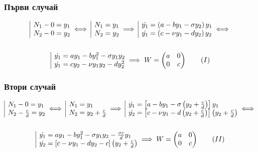 \documentclass[a4paper,fleqn,12pt]{article}
\begin{document}
\subsubsection{Първи случай}
\begin{gather*}
	\begin{array}{|l@{}}%
		 N_1 - 0 = y_1\\
		 N_2 - 0 = y_2
	\end{array} \iff 
	\begin{array}{|l@{}}%
		 N_1 = y_1\\
		 N_2 = y_2
	\end{array} \implies
	\begin{array}{|l@{}}
		\dot{y_1} = \left(a - by_1 - \sigma y_2 \right) y_1\\
		\dot{y_1} = \left(c - \nu y_1 - d y_2 \right) y_2 
	\end{array} \iff \\ \\
	\begin{array}{|l@{}}
		\dot{y_1} = ay_1 - by_1 ^2- \sigma y_1 y_2 \\
		\dot{y_1} = cy_2 - \nu y_1y_2 - d y_2 ^2 
	\end{array} 
\implies  W = \begin{pmatrix} a&0\\0&c \end{pmatrix} \tag{$I$}
\end{gather*}
\subsubsection{Втори случай}
\begin{gather*}
	\begin{array}{|l@{}}%
		 N_1 - 0 = y_1\\
		 N_2 - \frac{c}{d}= y_2
	\end{array} \iff 
	\begin{array}{|l@{}}%
		 N_1 = y_1\\
		 N_2 = y_2 + \frac{c}{d}
	\end{array} \implies
	\begin{array}{|l@{}}
		\dot{y_1} = \left[a - by_1 - \sigma \left(y_2 + \frac{c}{d} \right) \right] y_1\\
		\dot{y_2} = \left[c - \nu y_1 - d \left(y_2 + \frac{c}{d} \right) \right] \left(y_2 + \frac{c}{d} \right) 
	\end{array} \iff \\ \\
	\begin{array}{|l@{}}
		\dot{y_1} = ay_1 - by_1 ^2- \sigma y_1 y_2 - \frac{\sigma c}{d} y_1\\
		\dot{y_2} = \left[c - \nu y_1 - dy_2 -c \right] \left(y_2 + \frac{c}{d} \right)  
	\end{array} 
\implies  W = \begin{pmatrix} a&0\\0&c \end{pmatrix} \tag{$II$}
\end{gather*}
\end{document}
